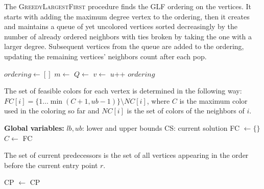 \vspace{10pt}
The \textsc{GreedyLargestFirst} procedure finds the GLF ordering on the vertices. It starts with adding the maximum degree vertex to the ordering, then it creates and maintains a queue of yet uncolored vertices sorted decreasingly by the number of already ordered neighbors with ties broken by taking the one with a larger degree.
Subsequent vertices from the queue are added to the ordering, updating the remaining vertices' neighbors count after each pop.
\vspace{10pt}
\begin{algorithmic}[1]
    \ls $ordering \gets []$
    \ls $m \gets $ 
    \ls $Q \gets $   
            \ls {}
    \mEndFor
        \ls $v \gets $ 
        \ls {}
            \ls $u$++
        \mEndFor
    \mEndWhile
    \ls \RETURN$ordering$
	\mEndProcedure
\end{algorithmic}
\vspace{10pt}
The set of feasible colors for each vertex is determined in the following way: $FC[i] = \{1\dots \min{(C+1, ub -1)}\} \setminus NC[i] $, where $C$ is the maximum color used in the coloring so far and $NC[i]$ is the set of colors of the neighbors of $i$.
\vspace{10pt}
\begin{algorithmic}[1]
 \Statex \textbf{Global variables:}
 \Statex $lb, ub$: lower and upper bounds
 \Statex CS: current solution
        \ls FC $\gets \{\}$
        \ls $C \gets$ 
            \ls {}
        \mEndFor
            \ls {}
        \mEndFor
        \ls \RETURN FC
	\mEndProcedure
\end{algorithmic}
\vspace{10pt}
The set of current predecessors is the set of all vertices appearing in the order before the current entry point $r$.
\vspace{10pt}
\begin{algorithmic}[1]
        \ls CP $\gets$ 
            \ls {}
        \mEndFor
        \ls \RETURN CP
	\mEndProcedure
\end{algorithmic}

